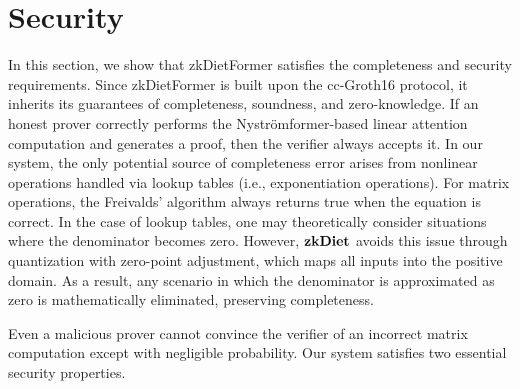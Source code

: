 \documentclass[letterpaper,twocolumn,10pt]{article}
\begin{document}
\section{Security}
\label{sec:figs}
In this section, we show that zkDietFormer satisfies the completeness and security requirements. Since zkDietFormer is built upon the cc-Groth16 protocol, it inherits its guarantees of completeness, soundness, and zero-knowledge.
If an honest prover correctly performs the Nyströmformer-based linear attention computation and generates a proof, then the verifier always accepts it. In our system, the only potential source of completeness error arises from nonlinear operations handled via lookup tables (i.e., exponentiation operations). For matrix operations, the Freivalds’ algorithm always returns true when the equation is correct. In the case of lookup tables, one may theoretically consider situations where the denominator becomes zero. However, ${\bf zkDiet}$ avoids this issue through quantization with zero-point adjustment, which maps all inputs into the positive domain. As a result, any scenario in which the denominator is approximated as zero is mathematically eliminated, preserving completeness.


Even a malicious prover cannot convince the verifier of an incorrect matrix computation except with negligible probability. Our system satisfies two essential security properties.
\end{document}
